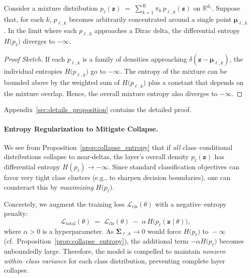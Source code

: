 \begin{proposition}
\label{prop:collapse_entropy}
Consider a mixture distribution 
\(
  p_\ell(\mathbf{z}) \;=\; \sum_{k=1}^K \pi_k\,p_{\ell,k}(\mathbf{z})
\)
on $\mathbb{R}^{d_\ell}$.
Suppose that, for each $k$, $p_{\ell,k}$ becomes arbitrarily concentrated around a single point $\boldsymbol{\mu}_{\ell,k}$.
In the limit where each $p_{\ell,k}$ approaches a Dirac delta, the differential entropy $H\bigl(p_\ell\bigr)$ diverges to $-\infty$. 
\end{proposition}


\begin{proof}[Proof Sketch]
If each $p_{\ell,k}$ is a family of densities approaching $\delta(\mathbf{z}-\boldsymbol{\mu}_{\ell,k})$, the individual entropies $H\bigl(p_{\ell,k}\bigr)$ go to $-\infty$. The entropy of the mixture can be bounded above by the weighted sum of $H\bigl(p_{\ell,k}\bigr)$ plus a constant that depends on the mixture overlap. Hence, the overall mixture entropy also diverges to $-\infty$. 
\end{proof}
Appendix~\ref{sec:details_proposition} contains the detailed proof.



\paragraph{Entropy Regularization to Mitigate Collapse.}
We see from Proposition~\ref{prop:collapse_entropy} that if \emph{all} class--conditional distributions collapse to near-deltas, the layer's overall density $p_\ell(\mathbf{z})$ has differential entropy $H(p_\ell)\to -\infty$.  Since standard classification objectives can favor very tight class clusters (e.g., to sharpen decision boundaries), one can counteract this by \emph{maximizing} $H\bigl(p_\ell\bigr)$.

Concretely, we augment the training loss $\mathcal{L}_{\mathrm{cls}}(\theta)$ with a negative--entropy penalty:
\begin{equation}
\label{eq:entropy_regularizer}
   \mathcal{L}_{\mathrm{total}}(\theta)
   \;=\;
   \mathcal{L}_{\mathrm{cls}}(\theta)
   \;-\;
   \alpha \, H\bigl(p_\ell(\mathbf{z}\mid\theta)\bigr),
\end{equation}
where $\alpha>0$ is a hyperparameter.  As $\boldsymbol{\Sigma}_{\ell,k}\to 0$ would force $H\bigl(p_\ell\bigr)$ to $\!-\infty$ (cf.\ Proposition~\ref{prop:collapse_entropy}), the additional term $-\alpha H\bigl(p_\ell\bigr)$ becomes unboundedly large.  Therefore, the model is compelled to maintain \emph{nonzero within--class variance} for each class distribution, preventing complete layer collapse.


